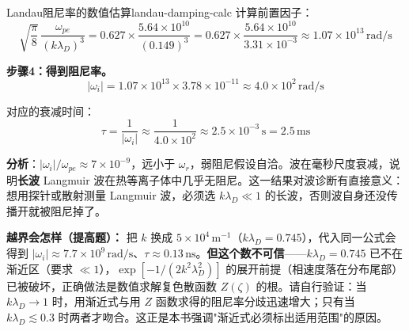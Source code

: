\begin{example}{Landau阻尼率的数值估算}{landau-damping-calc}
计算前置因子：
\[
\sqrt{\frac{\pi}{8}}\,\frac{\omega_{pe}}{(k\lambda_D)^3}
= 0.627\times \frac{5.64\times 10^{10}}{(0.149)^3}
= 0.627\times \frac{5.64\times 10^{10}}{3.31\times 10^{-3}}
\approx 1.07\times 10^{13}\,\mathrm{rad/s}
\]

\textbf{步骤4：得到阻尼率。}
\[
|\omega_i| = 1.07\times 10^{13}\times 3.78\times 10^{-11} \approx 4.0\times 10^{2}\,\mathrm{rad/s}
\]

对应的衰减时间：
\[
\tau = \frac{1}{|\omega_i|} \approx \frac{1}{4.0\times 10^{2}} \approx 2.5\times 10^{-3}\,\mathrm{s} = 2.5\,\mathrm{ms}
\]

\textbf{分析}：$|\omega_i|/\omega_{pe}\approx7\times10^{-9}$，远小于 $\omega_r$，弱阻尼假设自洽。波在毫秒尺度衰减，说明\textbf{长波} Langmuir 波在热等离子体中几乎无阻尼。这一结果对波诊断有直接意义：想用探针或散射测量 Langmuir 波，必须选 $k\lambda_D\ll1$ 的长波，否则波自身还没传播开就被阻尼掉了。

\textbf{越界会怎样（提高题）：} 把 $k$ 换成 $5\times10^{4}\,\mathrm{m^{-1}}$（$k\lambda_D=0.745$），代入同一公式会得到 $|\omega_i|\approx7.7\times10^{9}\,\mathrm{rad/s}$、$\tau\approx0.13\,\mathrm{ns}$。\textbf{但这个数不可信}——$k\lambda_D=0.745$ 已不在渐近区（要求 $\ll1$），$\exp[-1/(2k^2\lambda_D^2)]$ 的展开前提（相速度落在分布尾部）已被破坏，正确做法是数值求解复色散函数 $Z(\zeta)$ 的根。请自行验证：当 $k\lambda_D\to1$ 时，用渐近式与用 $Z$ 函数求得的阻尼率分歧迅速增大；只有当 $k\lambda_D\lesssim0.3$ 时两者才吻合。这正是本书强调"渐近式必须标出适用范围"的原因。
\end{example}

